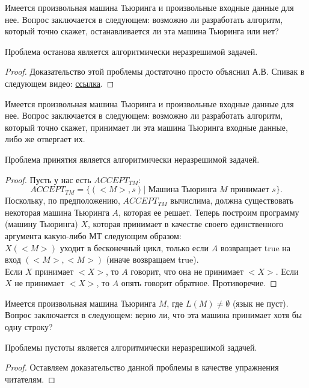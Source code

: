     
    \begin{Def}
        Имеется произвольная машина Тьюринга и произвольные входные данные для нее. Вопрос заключается в следующем: возможно ли разработать алгоритм, который точно скажет, останавливается ли эта машина Тьюринга или нет?
    \end{Def}
    \begin{Thm}
        Проблема останова является алгоритмически неразрешимой задачей.
    \end{Thm}
    \begin{proof}
         Доказательство этой проблемы достаточно просто объяснил А.В. Спивак в следующем видео:
        \href{https://www.youtube.com/watch?v=JDWM6tL5oPs&ab_channel=Vanechki%3A%D0%BC%D0%B0%D1%82%D0%B5%D0%BC%D0%B0%D1%82%D0%B8%D0%BA%D0%B0%2C%D0%B1%D0%B8%D0%BE%D0%BB%D0%BE%D0%B3%D0%B8%D1%8F%D0%B8%D0%BC%D0%BD%D0%BE%D0%B3%D0%BE%D0%B5%D0%B4%D1%80%D1%83%D0%B3%D0%BE%D0%B5}{ссылка}.
    \end{proof}
    \begin{Def}
        Имеется произвольная машина Тьюринга и произвольные входные данные для нее. Вопрос заключается в следующем: возможно ли разработать алгоритм, который точно скажет, принимает ли эта машина Тьюринга входные данные, либо же отвергает их.
    \end{Def}
    \begin{Thm}
        Проблема принятия является алгоритмически неразрешимой задачей.
    \end{Thm}
    \begin{proof}
        Пусть у нас есть $ACCEPT_{TM}$:
        $$ACCEPT_{TM} = \{(<M>, s ) | \text{ Машина Тьюринга } M \text{ принимает } s\}.$$
        Поскольку, по предположению, $ACCEPT_{TM}$ вычислима, должна существовать некоторая машина Тьюринга $A$, которая ее решает. 
        Теперь построим программу (машину Тьюринга) $X$, которая принимает в качестве своего единственного аргумента какую-либо МТ следующим образом:\\
        $X(<M>)$ уходит в бесконечный цикл, только если
        $A$ возвращает true на вход $(<M>, <M>)$ (иначе возвращаем true).\\
        Если $X$ принимает $<X>$, то $A$ говорит, что она не принимает $<X>$. Если $X$ не принимает $<X>$, то $A$ опять говорит обратное. Противоречие.
    \end{proof}
    \begin{Def}
        Имеется произвольная машина Тьюринга $M$, где $L(M) \neq \emptyset$ (язык не пуст). Вопрос заключается в следующем: верно ли, что эта машина принимает хотя бы одну строку?
    \end{Def}
    \begin{Thm}
        Проблемы пустоты является алгоритмически неразрешимой задачей.
    \end{Thm}
    \begin{proof}
        Оставляем доказательство данной проблемы в качестве упражнения читателям.
    \end{proof}
    
